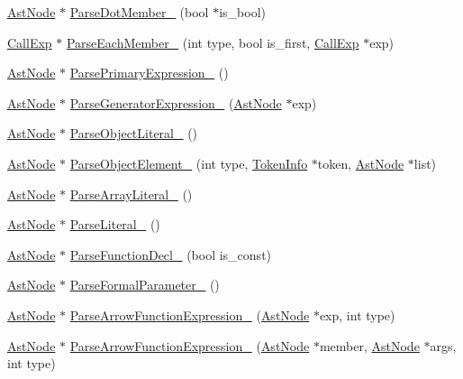 \begin{DoxyCompactItemize}
\item 
\hyperlink{classmocha_1_1_ast_node}{AstNode} $\ast$ \hyperlink{classmocha_1_1_parser_a5f89deb757684dd0db30adab55414d3a}{ParseDotMember\_\-} (bool $\ast$is\_\-bool)
\item 
\hyperlink{classmocha_1_1_call_exp}{CallExp} $\ast$ \hyperlink{classmocha_1_1_parser_a1d690e4fb9cd6ceaa210e000e0071f89}{ParseEachMember\_\-} (int type, bool is\_\-first, \hyperlink{classmocha_1_1_call_exp}{CallExp} $\ast$exp)
\item 
\hyperlink{classmocha_1_1_ast_node}{AstNode} $\ast$ \hyperlink{classmocha_1_1_parser_a9eb79e6248f736befab9d89ddcd469ac}{ParsePrimaryExpression\_\-} ()
\item 
\hyperlink{classmocha_1_1_ast_node}{AstNode} $\ast$ \hyperlink{classmocha_1_1_parser_ab73f697339a6f184ad99e00d90dc1bb6}{ParseGeneratorExpression\_\-} (\hyperlink{classmocha_1_1_ast_node}{AstNode} $\ast$exp)
\item 
\hyperlink{classmocha_1_1_ast_node}{AstNode} $\ast$ \hyperlink{classmocha_1_1_parser_aa38213100dca6a61a18391d28721c6a1}{ParseObjectLiteral\_\-} ()
\item 
\hyperlink{classmocha_1_1_ast_node}{AstNode} $\ast$ \hyperlink{classmocha_1_1_parser_add66e8d59d80ed3f72fb8e64b62c2f26}{ParseObjectElement\_\-} (int type, \hyperlink{classmocha_1_1_token_info}{TokenInfo} $\ast$token, \hyperlink{classmocha_1_1_ast_node}{AstNode} $\ast$list)
\item 
\hyperlink{classmocha_1_1_ast_node}{AstNode} $\ast$ \hyperlink{classmocha_1_1_parser_abde6c1d67a7720a0d922dff3446c4387}{ParseArrayLiteral\_\-} ()
\item 
\hyperlink{classmocha_1_1_ast_node}{AstNode} $\ast$ \hyperlink{classmocha_1_1_parser_a412d660401166573a01b8dbc6f5cf522}{ParseLiteral\_\-} ()
\item 
\hyperlink{classmocha_1_1_ast_node}{AstNode} $\ast$ \hyperlink{classmocha_1_1_parser_a4a78260898ece51074e538147042c449}{ParseFunctionDecl\_\-} (bool is\_\-const)
\item 
\hyperlink{classmocha_1_1_ast_node}{AstNode} $\ast$ \hyperlink{classmocha_1_1_parser_a4baaca0963ef048bc46950b8611f4da9}{ParseFormalParameter\_\-} ()
\item 
\hyperlink{classmocha_1_1_ast_node}{AstNode} $\ast$ \hyperlink{classmocha_1_1_parser_ac726663ecdb4ba6234a3eeee86a7c898}{ParseArrowFunctionExpression\_\-} (\hyperlink{classmocha_1_1_ast_node}{AstNode} $\ast$exp, int type)
\item 
\hyperlink{classmocha_1_1_ast_node}{AstNode} $\ast$ \hyperlink{classmocha_1_1_parser_a164a6c85ed2aab9207663dccbfb407bd}{ParseArrowFunctionExpression\_\-} (\hyperlink{classmocha_1_1_ast_node}{AstNode} $\ast$member, \hyperlink{classmocha_1_1_ast_node}{AstNode} $\ast$args, int type)

\end{DoxyCompactItemize}
